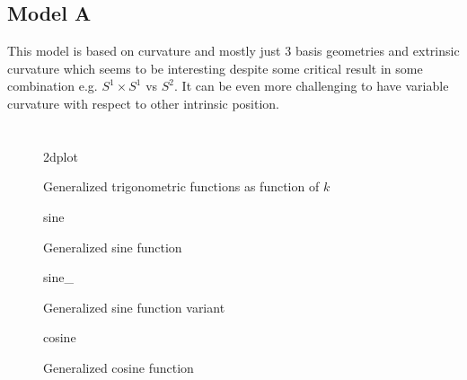 \documentclass[stu, babel, american, biblatex, a4paper, leqno, draftall]{apa7}
\newcommand{\insertstandalone}[2]{{#2}}
\newcommand{\insertstandalone}[2]{\texttt{[image: \#1/\#2.pdf]}}
\begin{document}
\subsection{Model A}
This model is based on curvature and mostly just 3 basis geometries and extrinsic curvature which seems to be interesting despite some critical result in some combination e.g. $S^1 \times S^1$ vs $S^2$. It can be even more challenging to have variable curvature with respect to other intrinsic position.
\section*{}
\printbibliography
\begin{figure}
    \centering
    \insertstandalone{figures}{2dplot}
    \caption{Generalized trigonometric functions as function of $k$}\label{TrigonometryPlotted}
\end{figure}
\begin{figure}
    \centering
    \insertstandalone{figures}{sine}
    \caption{Generalized sine function}\label{TrigonometrySinePlotted}
\end{figure}
\begin{figure}
    \centering
    \insertstandalone{figures}{sine_}
    \caption{Generalized sine function variant}\label{TrigonometrySineVarPlotted}
\end{figure}
\begin{figure}
    \centering
    \insertstandalone{figures}{cosine}
    \caption{Generalized cosine function}\label{TrigonometryCosinePlotted}
\end{figure}
\end{document}
